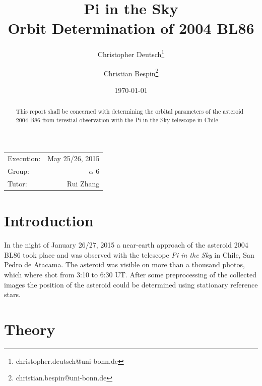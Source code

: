 \documentclass[11pt, a4paper]{article}
\title{Pi in the Sky\\Orbit Determination of 2004 BL86}
\author{Christopher Deutsch\footnote{christopher.deutsch@uni-bonn.de} \and Christian Bespin\footnote{christian.bespin@uni-bonn.de}}
\date{\today}
\numberwithin{equation}{section}
\begin{document}
\begin{titlepage}

\maketitle

\begin{center}
\begin{tabular}{l r}
Execution: & May 25/26, 2015 \\
Group: & $\alpha$ 6 \\
Tutor: & Rui Zhang
\end{tabular}
\end{center}

\begin{abstract}
\noindent 
This report shall be concerned with determining the orbital parameters of the asteroid 2004 B86 from terestial observation with the Pi in the Sky telescope in Chile.
\end{abstract}

\end{titlepage}

\tableofcontents
\newpage


\section{Introduction}
In the night of January 26/27, 2015 a near-earth approach of the asteroid 2004 BL86 took place and was observed with the telescope \emph{Pi in the Sky} in Chile, San Pedro de Atacama.
The asteroid was visible on more than a thousand photos, which where shot from 3:10 to 6:30 UT.
After some preprocessing of the collected images the position of the asteroid could be determined using stationary reference stars.

\section{Theory}
\end{document}

